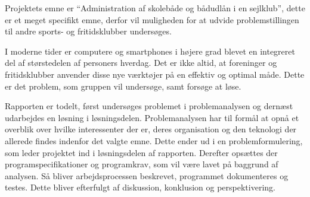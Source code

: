 Projektets emne er ``Administration af skolebåde og bådudlån i en sejlklub'', dette er et meget specifikt emne, derfor vil  muligheden for at udvide problemstillingen til andre sports- og fritidsklubber undersøges.

I moderne tider er computere og smartphones i højere grad blevet en integreret del af størstedelen af personers hverdag.  \citep{dstSPogPC} 
Det er ikke altid, at foreninger og fritidsklubber anvender disse nye værktøjer på en effektiv og optimal måde. 
Dette er det problem, som gruppen vil undersøge, samt forsøge at løse.

Rapporten er todelt, først undersøges problemet i problemanalysen og dernæst udarbejdes en løsning i løsningsdelen. 
Problemanalysen har til formål at opnå et overblik over hvilke interessenter der er, deres organisation og den teknologi der allerede findes indenfor det valgte emne. 
Dette ender ud i en problemformulering, som leder projektet ind i løsningsdelen af rapporten. 
Derefter opsættes der programspecifikationer og programkrav, som vil være lavet på baggrund af analysen. 
Så bliver arbejdsprocessen beskrevet, programmet dokumenteres og testes. 
Dette bliver efterfulgt af diskussion, konklusion og perspektivering.

